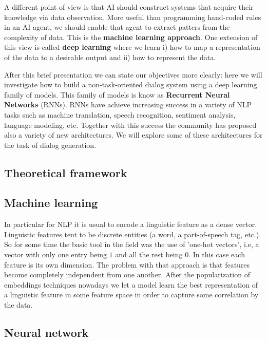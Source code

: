 \par A different point of view is that AI should construct systems that acquire their knowledge via data observation. 
More useful than programming hand-coded rules in an AI agent, we should enable that agent to extract patters from the complexity of data. This is the \textbf{machine learning approach}. One extension of this view is called \textbf{deep learning} where we learn i) how to map a representation of the data to a desirable output and ii) how to represent the data.

\par After this brief presentation we can state our objectives more clearly: here we will investigate how to build a non-task-oriented dialog system using a deep learning family of models. This family of models is know as \textbf{Recurrent Neural Networks} (RNNs). RNNs have achieve increasing success in a variety of NLP tasks such as machine translation, speech recognition, sentiment analysis, language modeling, etc. Together with this success the community has proposed also a variety of new architectures. We will explore some of these architectures for the task of dialog generation.




\subsection{Theoretical framework}

\subsection{Machine learning}


In particular for NLP it is usual to encode a linguistic feature as a dense vector. Linguistic features tent to be discrete entities (a word, a part-of-speech tag, etc.). So for some time the basic tool in the field was the use of 'one-hot vectors', i.e, a vector with only one entry being $1$ and all the rest being $0$. In this case each feature is its own dimension. The problem with that approach is that features become completely independent from one another. After the popularization of embeddings techniques \cite{Mikolov23} nowadays we let a model learn the best representation of a linguistic feature in some feature space in order to capture some correlation by the data.


\subsection{Neural network}


